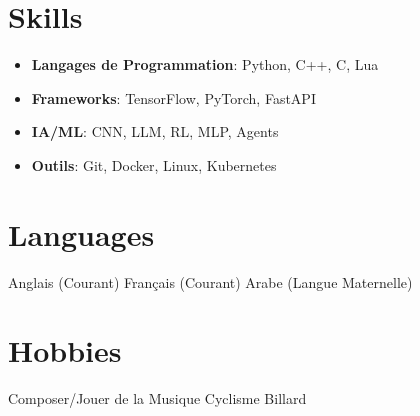 \documentclass[a4paper,11pt]{article}%
\begin{document}
\section*{Skills}%
\begin{itemize}[leftmargin=*]%
\item \textbf{Langages de Programmation}: Python, C++, C, Lua%
\item \textbf{Frameworks}: TensorFlow, PyTorch, FastAPI%
\item \textbf{IA/ML}: CNN, LLM, RL, MLP, Agents%
\item \textbf{Outils}: Git, Docker, Linux, Kubernetes%
\end{itemize}%
\section*{Languages}%
Anglais (Courant)%
\newline%
%
Fran\c{c}ais (Courant)%
\newline%
%
Arabe (Langue Maternelle)%
\newline%
%
\section*{Hobbies}%
Composer/Jouer de la Musique%
\newline%
%
Cyclisme%
\newline%
%
Billard%
\newline%
%
\end{document}
